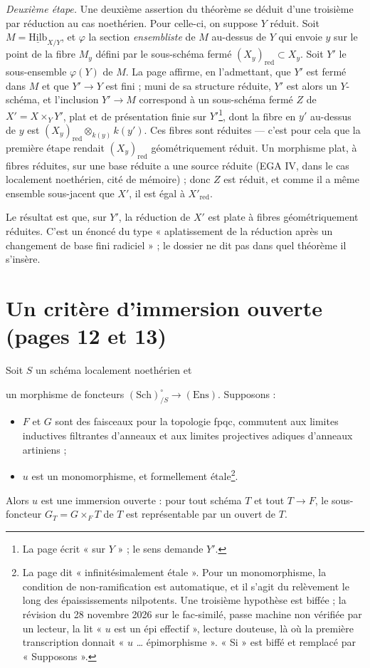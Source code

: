 \documentclass[11pt,a4paper]{article}
\begin{document}
\emph{Deuxième étape.} Une deuxième assertion du théorème se déduit d'une
troisième par réduction au cas noethérien. Pour celle-ci, on suppose $Y$ réduit.
Soit $M = \underline{\mathrm{Hilb}}_{X/Y}$, et $\varphi$ la section
\emph{ensembliste} de $M$ au-dessus de $Y$ qui envoie $y$ sur le point de la
fibre $M_y$ défini par le sous-schéma fermé $(X_y)_{\mathrm{red}} \subset X_y$.
Soit $Y'$ le sous-ensemble $\varphi(Y)$ de $M$. La page affirme, en
l'admettant, que $Y'$ est fermé dans $M$ et que $Y' \to Y$ est fini ; muni de sa
structure réduite, $Y'$ est alors un $Y$-schéma, et l'inclusion $Y' \to M$
correspond à un sous-schéma fermé $Z$ de $X' = X \times_Y Y'$, plat et de
présentation finie sur $Y'$\footnote{La page écrit « sur $Y$ » ; le sens demande
$Y'$.}, dont la fibre en $y'$ au-dessus de $y$ est
$(X_y)_{\mathrm{red}} \otimes_{k(y)} k(y')$. Ces fibres sont réduites — c'est
pour cela que la première étape rendait $(X_y)_{\mathrm{red}}$ géométriquement
réduit. Un morphisme plat, à fibres réduites, sur une base réduite a une source
réduite (EGA IV, dans le cas localement noethérien, cité de mémoire) ; donc $Z$ est réduit, et comme il a même
ensemble sous-jacent que $X'$, il est égal à $X'_{\mathrm{red}}$.

Le résultat est que, sur $Y'$, la réduction de $X'$ est plate à fibres
géométriquement réduites. C'est un énoncé du type « aplatissement de la
réduction après un changement de base fini radiciel » ; le dossier ne dit pas
dans quel théorème il s'insère.

\section*{Un critère d'immersion ouverte (pages 12 et 13)}

Soit $S$ un schéma localement noethérien et


un morphisme de foncteurs $(\mathrm{Sch})^{\circ}_{/S} \to (\mathrm{Ens})$.
Supposons :
\begin{itemize}
  \item[(i)] $F$ et $G$ sont des faisceaux pour la topologie fpqc, commutent aux
    limites inductives filtrantes d'anneaux et aux limites projectives adiques
    d'anneaux artiniens ;
  \item[(ii)] $u$ est un monomorphisme, et formellement étale\footnote{La page
    dit « infinitésimalement étale ». Pour un monomorphisme, la condition de
    non-ramification est automatique, et il s'agit du relèvement le long des
    épaississements nilpotents. Une troisième hypothèse est biffée ; la révision du 28 novembre 2026 sur le fac-similé, passe machine non vérifiée par un lecteur,
    la lit « $u$ est un épi effectif », lecture douteuse, là où la première
    transcription donnait « $u$ … épimorphisme ». « Si » est biffé et
    remplacé par « Supposons ».}.
\end{itemize}
Alors $u$ est une immersion ouverte : pour tout schéma $T$ et tout $T \to F$,
le sous-foncteur $G_T = G \times_F T$ de $T$ est représentable par un ouvert de
$T$.
\end{document}
